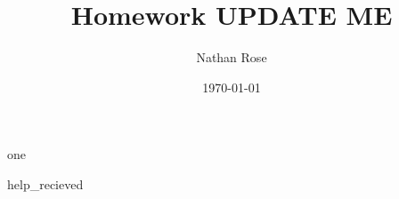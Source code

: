 \documentclass[11pt]{article}
\title{Homework UPDATE ME}
\author{Nathan Rose}
\date{\today}
\begin{document}
\maketitle
\begin{enumerate}
  {one}
\end{enumerate}
{help_recieved}
\end{document}
